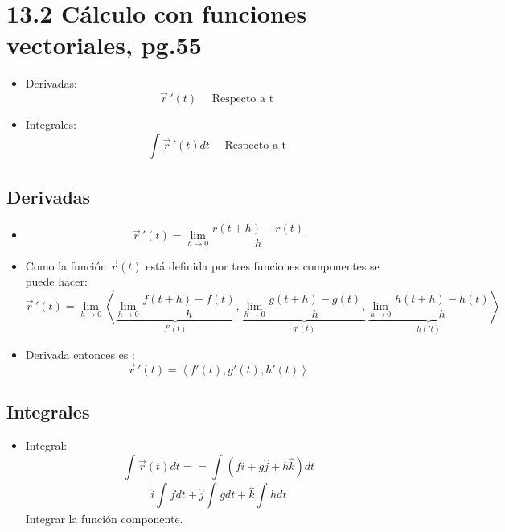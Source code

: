 \section{13.2 Cálculo con funciones vectoriales, pg.55}
\begin{itemize}
    \item Derivadas:
        \[
          \vec{r}\,'(t) \quad \text{  Respecto a t  }
        \]
    
    \item Integrales:
        \[
          \int_{}^{}\vec{r}\,'(t)dt \quad \text{  Respecto a t  }
        \]
\end{itemize}


\subsection{Derivadas}
\begin{itemize}
    \item \[
      \vec{r}\,'(t) = \lim_{h \to 0} \frac{r(t+h)-r(t)}{h} 
    \]
    
    \item Como la función $\vec{r}(t)$ está definida por tres funciones componentes se puede hacer: 
        \[
          \vec{r}\,'(t) = \lim_{h \to 0} \left\langle 
          \underbrace{\lim_{h \to 0} \frac{f(t+h)-f(t)}{h}}_{f'(t)}, 
          \underbrace{\lim_{h \to 0} \frac{g(t+h)-g(t)}{h}, }_{g'(t)}
          \underbrace{\lim_{h \to 0} \frac{h(t+h)-h(t)}{h}  }_{h('t)}
          \right\rangle 
        \]
    
    \item Derivada entonces es : 
        \[
          \vec{r}\,'(t) = \left\langle f'(t),g'(t),h'(t) \right\rangle 
        \]
\end{itemize}


\subsection{Integrales}
\begin{itemize}
    \item Integral:
        \[
          \int_{}^{}\vec{r}(t)dt = = \int_{}^{}(f \hat{i} + g \hat{j} + h \hat{k} )dt
        \]
        \[
          \hat{i} \int_{}^{}fdt + \hat{j} \int_{}^{}gdt + \hat{k} \int_{}^{}hdt 
        \]
        Integrar la función componente.
\end{itemize}


